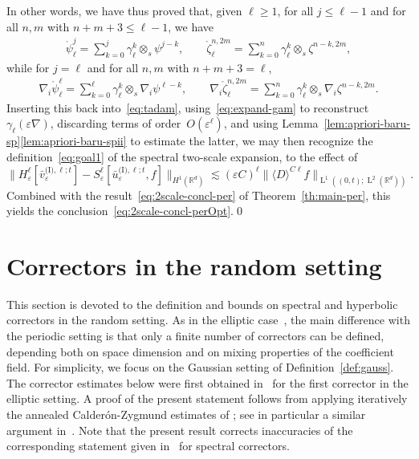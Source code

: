 \documentclass[JEP,XML,SOM,Unicode,published]{cedram}
\theoremstyle{plain}
\theoremstyle{definition}
\numberwithin{equation}{section}
\newcommand{\e}{\varepsilon}
\newcommand{\R}{\mathbb R}
\newcommand{\Ld}{\operatorname{L}}
\begin{document}
{In other words, we have thus proved that, given $\ell\geq1$, for all $j\le\ell-1$ and for all $n,m$ with $n+m+3\le\ell-1$, we have\vspace*{-3pt}
\begin{align*}
\mathring\psi_\ell^j=\sum_{k=0}^j\gamma_\ell^k\otimes_s\psi^{j-k},\qquad \mathring\zeta_\ell^{n,2m}=\sum_{k=0}^n\gamma_\ell^k\otimes_s\zeta^{n-k,2m},
\end{align*}
while for $j=\ell$ and for all $n,m$ with $n+m+3=\ell$,\vspace*{-3pt}
\begin{align*}
\nabla_i\mathring\psi_\ell^{\ell}=\sum_{k=0}^{\ell}\gamma_\ell^k\otimes_s\nabla_i\psi^{\ell-k},\qquad \nabla_i\mathring\zeta_\ell^{n,2m}=\sum_{k=0}^n\gamma_\ell^k\otimes_s\nabla_i\zeta^{n-k,2m}.
\end{align*}
Inserting this back into~\eqref{eq:tadam}, using~\eqref{eq:expand-gam} to reconstruct $\gamma_\ell(\e\nabla)$, discarding terms of order~$O(\e^\ell)$, and using Lemma~\ref{lem:apriori-baru-sp}\eqref{lem:apriori-baru-spii} to estimate the latter,
we may then recognize the definition~\eqref{eq:goal1} of the spectral two-scale expansion, to the effect of\vspace*{-3pt}
\begin{equation*}
\|H^\ell_\e[\bar v_\e^{\text{(I)},\ell;t}]
-S_\e^\ell[\bar u_\e^{\text{(I)},\ell;t},f]\|_{H^1(\R^d)}
\lesssim
(\e C)^{\ell}\|\langle D\rangle^{C\ell}f\|_{\Ld^1((0,t);\Ld^2(\R^d))}.
\end{equation*}
Combined} with the result~\eqref{eq:2scale-concl-per} of Theorem~\ref{th:main-per}, this yields the conclusion~\eqref{eq:2scale-concl-perOpt}.\qed

\appendix
\section{Correctors in the random setting}\label{sec:rand-cor}

This section is devoted to the definition and bounds on spectral and hyperbolic correctors in the random setting.
As in the elliptic case~\cite{GNO-quant,AKM-book,Gu-17,DO1}, the main difference with the periodic setting is that only a finite number of correctors can be defined, depending both on space dimension and on mixing properties of the coefficient field.
For simplicity, we focus on the Gaussian setting of Definition~\ref{def:gauss}.
The corrector estimates below were first obtained in~\cite{GO1,Gloria-Otto-10b,GNO-quant} for the first corrector in the elliptic setting.
A proof of the present statement follows from applying iteratively the annealed Calder\'on-Zygmund estimates of \cite{DO1,DFG-22}; see in particular a similar argu\-ment in~\cite[Proof of Prop.\,2.2]{DO1}. Note that the present result corrects inaccuracies of the corresponding statement given in~\cite[Prop.\,C.4]{BG} for spectral correctors.
\end{document}
